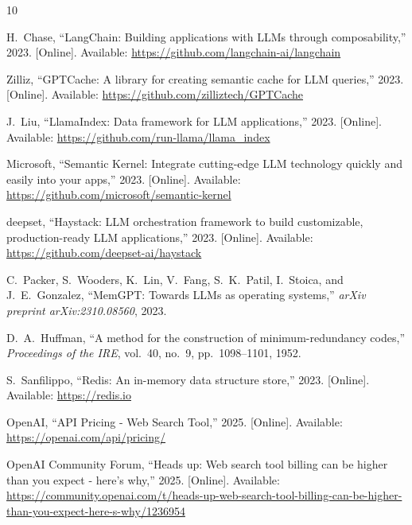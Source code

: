 \documentclass[conference]{IEEEtran}
\begin{document}
\begin{thebibliography}{10}

H.~Chase, ``LangChain: Building applications with LLMs through composability,'' 2023. [Online]. Available: \url{https://github.com/langchain-ai/langchain}

Zilliz, ``GPTCache: A library for creating semantic cache for LLM queries,'' 2023. [Online]. Available: \url{https://github.com/zilliztech/GPTCache}

J.~Liu, ``LlamaIndex: Data framework for LLM applications,'' 2023. [Online]. Available: \url{https://github.com/run-llama/llama_index}

Microsoft, ``Semantic Kernel: Integrate cutting-edge LLM technology quickly and easily into your apps,'' 2023. [Online]. Available: \url{https://github.com/microsoft/semantic-kernel}

deepset, ``Haystack: LLM orchestration framework to build customizable, production-ready LLM applications,'' 2023. [Online]. Available: \url{https://github.com/deepset-ai/haystack}

C.~Packer, S.~Wooders, K.~Lin, V.~Fang, S.~K.~Patil, I.~Stoica, and J.~E.~Gonzalez, ``MemGPT: Towards LLMs as operating systems,'' \textit{arXiv preprint arXiv:2310.08560}, 2023.

D.~A.~Huffman, ``A method for the construction of minimum-redundancy codes,'' \textit{Proceedings of the IRE}, vol.~40, no.~9, pp.~1098--1101, 1952.

S.~Sanfilippo, ``Redis: An in-memory data structure store,'' 2023. [Online]. Available: \url{https://redis.io}

OpenAI, ``API Pricing - Web Search Tool,'' 2025. [Online]. Available: \url{https://openai.com/api/pricing/}

OpenAI Community Forum, ``Heads up: Web search tool billing can be higher than you expect - here's why,'' 2025. [Online]. Available: \url{https://community.openai.com/t/heads-up-web-search-tool-billing-can-be-higher-than-you-expect-here-s-why/1236954}

\end{thebibliography}
\end{document}
